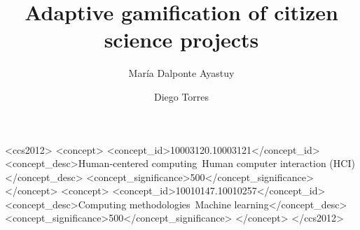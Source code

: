 \documentclass[sigconf]{acmart}
\begin{document}
\title{Adaptive gamification of citizen science projects}


\author{María Dalponte Ayastuy}

 


\author{Diego Torres}




\renewcommand{\shortauthors}{Dalponte and Torres}



\begin{CCSXML}
<ccs2012>
   <concept>
       <concept_id>10003120.10003121</concept_id>
       <concept_desc>Human-centered computing~Human computer interaction (HCI)</concept_desc>
       <concept_significance>500</concept_significance>
       </concept>
   <concept>
       <concept_id>10010147.10010257</concept_id>
       <concept_desc>Computing methodologies~Machine learning</concept_desc>
       <concept_significance>500</concept_significance>
       </concept>
 </ccs2012>
\end{CCSXML}
\end{document}
